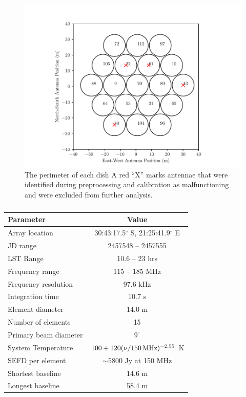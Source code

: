 \documentclass[twocolumn, trackchanges]{aastex61}
\begin{document}
\begin{figure}
\centering
\hspace{-0.5cm}\includegraphics[scale=0.6]{antpos_hera19.pdf}
\caption{ The perimeter of each dish  
A red ``X'' marks antennae that were identified during preprocessing and calibration as malfunctioning and were excluded from further analysis.}
\label{fig:antpos}
\end{figure}


\begin{table}
\centering
\caption{}
\begin{tabular}{lc}
\hline
Parameter & Value \\
\hline
Array location & 30:43:17.5$^\circ$ S, 21:25:41.9$^\circ$ E \\
JD range & 2457548 -- 2457555 \\
LST Range & 10.6 -- 23 hrs \\
Frequency range & 115 -- 185 MHz \\
Frequency resolution & 97.6 kHz \\
Integration time & 10.7 s\\
Element diameter & 14.0 m\\
Number of elements & 15 \\
Primary beam diameter & $9^{\circ}$ \\
System Temperature & $100 + 120(\nu / 150\,{\rm MHz})^{-2.55}$ K\\
SEFD per element & $\sim 5800$ Jy at 150 MHz\\
Shortest baseline & 14.6 m \\
Longest baseline & 58.4 m \\
\hline
\end{tabular}
\label{tab:params}
\end{table}
\end{document}
